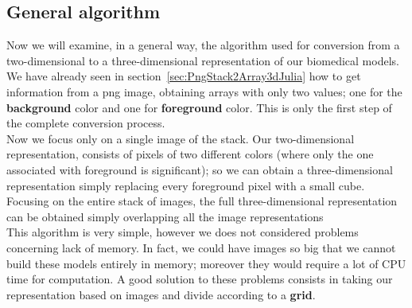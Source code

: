 \documentclass[11pt,oneside]{article}	%
\begin{document}
\subsection{General algorithm}\label{sec:generalAlgorithm}

Now we will examine, in a general way, the algorithm used for conversion from a two-dimensional to a three-dimensional representation of our biomedical models.\\
We have already seen in section~\ref{sec:PngStack2Array3dJulia} how to get information from a png image, obtaining arrays with only two values; one for the \textbf{background} color and one for \textbf{foreground} color. This is only the first step of the complete conversion process.\\

Now we focus only on a single image of the stack. Our two-dimensional representation, consists of pixels of two different colors (where only the one associated with foreground is significant); so we can obtain a three-dimensional representation simply replacing every foreground pixel with a small cube. Focusing on the entire stack of images, the full three-dimensional representation can be obtained simply overlapping all the image representations\\

This algorithm is very simple, however we does not considered problems concerning lack of memory. In fact, we could have images so big that we cannot build these models entirely in memory; moreover they would require a lot of CPU time for computation. A good solution to these problems consists in taking our representation based on images and divide according to a \textbf{grid}.\\
\end{document}
